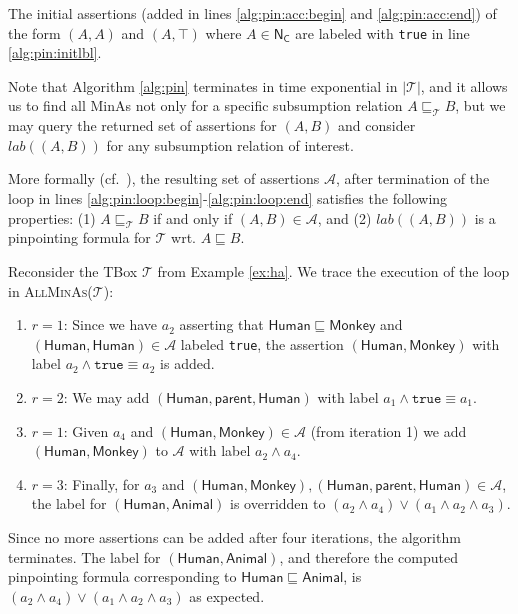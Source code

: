 \documentclass{llncs}
\newcommand{\tb}{\ensuremath{\mathcal{T}}\xspace} %
\newcommand{\nc}{\ensuremath{\mathsf{N_C}}\xspace} %
\newcommand{\subsume}{\sqsubseteq}
\begin{document}
The initial assertions (added in lines \ref{alg:pin:acc:begin} and \ref{alg:pin:acc:end}) of the form $(A, A)$ and $(A, \top)$ where $A \in \nc$ are labeled with \texttt{true} in line \ref{alg:pin:initlbl}.

Note that Algorithm \ref{alg:pin} terminates in time exponential in $|\tb|$, and it allows us to find all MinAs not only for a specific subsumption relation $A \subsume_\tb B$, but we may query the returned set of assertions for $(A, B)$ and consider $lab((A, B))$ for any subsumption relation of interest.

More formally (cf.~\cite[Thm.~2]{orig1,orig2}), the resulting set of assertions $\mathcal{A}$, after termination of the loop in lines \ref{alg:pin:loop:begin}-\ref{alg:pin:loop:end} satisfies the following properties: (1) $A \subsume_\tb B$ if and only if $(A, B) \in \mathcal{A}$, and (2) $lab((A,B))$ is a pinpointing formula for $\tb$ wrt. $A \subsume B$.

\begin{example}
Reconsider the TBox $\tb$ from Example \ref{ex:ha}. We trace the execution of the loop in \textsc{AllMinAs}(\tb):

\begin{enumerate}
\item $r = 1$: Since we have $a_2$ asserting that $\mathsf{Human} \subsume \mathsf{Monkey}$ and $(\mathsf{Human}, \mathsf{Human}) \in \mathcal{A}$ labeled \texttt{true}, the assertion $(\mathsf{Human}, \mathsf{Monkey})$ with label $a_2 \wedge\texttt {true} \equiv a_2$ is added.
\item $r = 2$: We may add $(\mathsf{Human}, \mathsf{parent}, \mathsf{Human})$ with label $a_1 \wedge \texttt{true} \equiv a_1$.
\item $r = 1$: Given $a_4$ and $(\mathsf{Human}, \mathsf{Monkey}) \in \mathcal{A}$ (from iteration 1) we add $(\mathsf{Human}, \mathsf{Monkey})$ to $\mathcal{A}$ with label $a_2 \wedge a_4$.
\item $r = 3$: Finally, for $a_3$ and $(\mathsf{Human}, \mathsf{Monkey}), (\mathsf{Human}, \mathsf{parent}, \mathsf{Human}) \in \mathcal{A}$, the label for $(\mathsf{Human}, \mathsf{Animal})$ is overridden to $(a_2 \wedge a_4) \vee (a_1 \wedge a_2 \wedge a_3)$.
\end{enumerate}

Since no more assertions can be added after four iterations, the algorithm terminates. The label for $(\mathsf{Human}, \mathsf{Animal})$, and therefore the computed pinpointing formula corresponding to $\mathsf{Human} \subsume \mathsf{Animal}$, is $(a_2 \wedge a_4) \vee (a_1 \wedge a_2 \wedge a_3)$ as expected.
\end{example}
\end{document}
